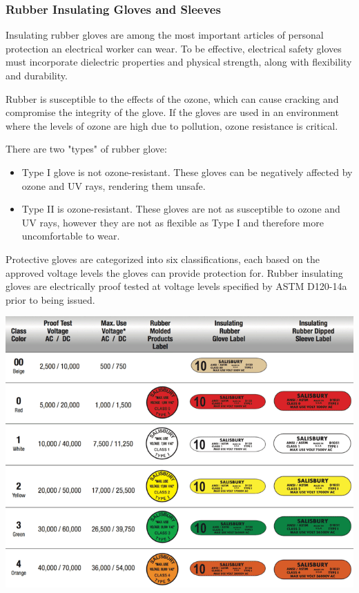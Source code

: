 \documentclass[11pt,a4paper]{article}
\begin{document}
\subsubsection*{Rubber Insulating Gloves and Sleeves}
Insulating rubber gloves are among the most important articles of personal protection an electrical worker can wear. To be effective, electrical safety gloves must incorporate dielectric properties and physical strength, along with flexibility and durability.

Rubber is susceptible to the effects of the ozone, which can cause cracking and compromise the integrity of the glove. If the gloves are used in an environment where the levels of ozone are high due to pollution, ozone resistance is critical.

There are two "types" of rubber glove:
\begin{itemize}
    \item Type I glove is not ozone-resistant. These gloves can be negatively affected by ozone and UV rays, rendering them unsafe.
    \item Type II is ozone-resistant. These gloves are not as susceptible to ozone and UV rays, however they are not as flexible as Type I and therefore more uncomfortable to wear.
\end{itemize}

Protective gloves are categorized into six classifications, each based on the approved voltage levels the gloves can provide protection for. Rubber insulating gloves are electrically proof tested at voltage levels specified by ASTM D120-14a prior to being issued.
\begin{center}
  \includegraphics[width=14cm]{gloveschart.png}\par
  \end{center}
\end{document}
